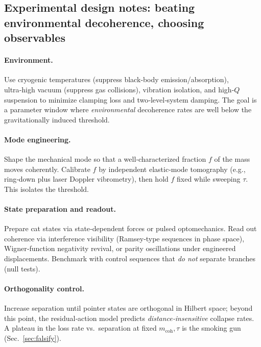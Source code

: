 \documentclass[11pt,letterpaper]{article}
\begin{document}
\subsection{Experimental design notes: beating environmental decoherence, choosing observables}

\paragraph{Environment.}
Use cryogenic temperatures (suppress black‑body emission/absorption), ultra‑high vacuum (suppress gas collisions), vibration isolation, and high‑$Q$ suspension to minimize clamping loss and two‑level‑system damping. The goal is a parameter window where \emph{environmental} decoherence rates are well below the gravitationally induced threshold. %

\paragraph{Mode engineering.}
Shape the mechanical mode so that a well‑characterized fraction $f$ of the mass moves coherently. Calibrate $f$ by independent elastic‑mode tomography (e.g., ring‑down plus laser Doppler vibrometry), then hold $f$ fixed while sweeping $\tau$. This isolates the threshold. %

\paragraph{State preparation and readout.}
Prepare cat states via state‑dependent forces or pulsed optomechanics. Read out coherence via interference visibility (Ramsey‑type sequences in phase space), Wigner‑function negativity revival, or parity oscillations under engineered displacements. Benchmark with control sequences that \emph{do not} separate branches (null tests). %

\paragraph{Orthogonality control.}
Increase separation until pointer states are orthogonal in Hilbert space; beyond this point, the residual‑action model predicts \emph{distance‑insensitive} collapse rates. A plateau in the loss rate vs.\ separation at fixed $m_{\mathrm{coh}},\tau$ is the smoking gun (Sec.~\ref{sec:falsify}). %
\end{document}
